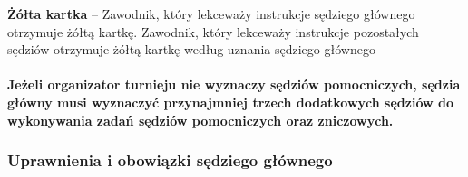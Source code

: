 \documentclass[12pt]{article}
\newcommand\yellowcard[1]{\bgroup\textcolor{darkyellow}{\textbf{#1}}}
\begin{document}
\yellowcard{Żółta kartka} -- Zawodnik, który lekceważy instrukcje sędziego
głównego otrzymuje żółtą kartkę. Zawodnik, który lekceważy instrukcje
pozostałych sędziów otrzymuje żółtą kartkę według uznania sędziego
głównego

\paragraph{Jeżeli organizator turnieju nie wyznaczy sędziów
	pomocniczych, sędzia główny musi wyznaczyć przynajmniej trzech
	dodatkowych sędziów do wykonywania zadań sędziów pomocniczych oraz
	zniczowych.}

\subsubsection{Uprawnienia i obowiązki sędziego głównego}
\end{document}
